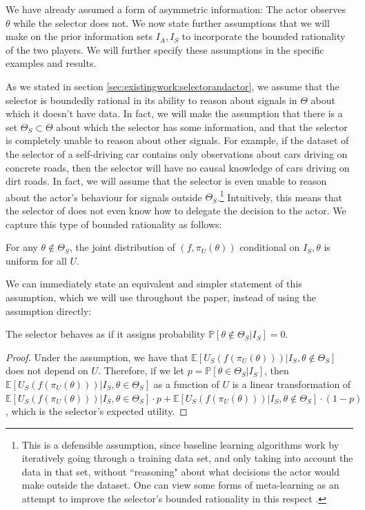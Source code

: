 We have already assumed a form of asymmetric information: The actor observes $\theta$ while the selector does not. We now state further assumptions that we will make on the prior information sets $I_A,I_S$ to incorporate the bounded rationality of the two players. We will further specify these assumptions in the specific examples and results.

As we stated in section \ref{sec:existingwork:selectorandactor}, we assume that the selector is boundedly rational in its ability to reason about signals in $\Theta$ about which it doesn't have data. In fact, we will make the assumption that there is a set $\Theta_S\subset\Theta$ about which the selector has some information, and that the selector is completely unable to reason about other signals. For example, if the dataset of the selector of a self-driving car contains only observations about cars driving on concrete roads, then the selector will have no causal knowledge of cars driving on dirt roads. In fact, we will assume that the selector is even unable to reason about the actor's behaviour for signals outside $\Theta_S$.\footnote{This is a defensible assumption, since baseline learning algorithms work by iteratively going through a training data set, and only taking into account the data in that set, without ``reasoning" about what decisions the actor would make outside the dataset. One can view some forms of meta-learning as an attempt to improve the selector's bounded rationality in this respect \citep{Andrychowicz2018}. } Intuitively, this means that the selector of does not even know how to delegate the decision to the actor. We capture this type of bounded rationality as follows:
\begin{assumption*}
	For any $\theta\notin \Theta_S$, the joint distribution of $(f,\pi_U(\theta))$ conditional on $I_S,\theta$ is uniform for all $U$.
\end{assumption*}
We can immediately state an equivalent and simpler statement of this assumption, which we will use throughout the paper, instead of using the assumption directly:

\begin{lemma}\label{lemma:selectorssignals}
	The selector behaves as if it assigns probability $\mathbb P[\theta\notin\Theta_S|I_S]=0$.
\end{lemma}
\begin{proof}
	Under the assumption, we have that $\mathbb E[U_S(f(\pi_U(\theta)))|I_S,\theta\notin \Theta_S]$ does not depend on $U$. Therefore, if we let $p=\mathbb P[\theta\in \Theta_S|I_S]$, then $\mathbb E[U_S(f(\pi_U(\theta)))|I_S,\theta\in\Theta_S]$ as a function of $U$ is a linear transformation of $\mathbb E[U_S(f(\pi_U(\theta)))|I_S,\theta\in\Theta_S]\cdot p + \mathbb E[U_S(f(\pi_U(\theta)))|I_S,\theta\notin \Theta_S]\cdot (1-p)$, which is the selector's expected utility.
\end{proof}

